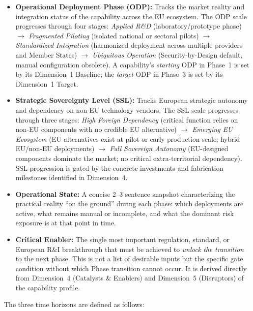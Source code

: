 \documentclass{ieeeaccess}
\begin{document}
\begin{itemize}
    \item \textbf{Operational Deployment Phase (ODP):} Tracks the market
    reality and integration status of the capability across the EU ecosystem.
    The ODP scale progresses through four stages:
    \emph{Applied R\&D} (laboratory/prototype phase) $\rightarrow$
    \emph{Fragmented Piloting} (isolated national or sectoral pilots) $\rightarrow$
    \emph{Standardized Integration} (harmonized deployment across multiple
    providers and Member States) $\rightarrow$
    \emph{Ubiquitous Operation} (Security-by-Design default, manual
    configuration obsolete). A capability's \emph{starting} ODP in Phase~1
    is set by its Dimension~1 Baseline; the \emph{target} ODP in Phase~3
    is set by its Dimension~1 Target.

    \item \textbf{Strategic Sovereignty Level (SSL):} Tracks European
    strategic autonomy and dependency on non-EU technology vendors. The SSL
    scale progresses through three stages:
    \emph{High Foreign Dependency} (critical function relies on non-EU
    components with no credible EU alternative) $\rightarrow$
    \emph{Emerging EU Ecosystem} (EU alternatives exist at pilot or early
    production scale; hybrid EU/non-EU deployments) $\rightarrow$
    \emph{Full Sovereign Autonomy} (EU-designed components dominate the
    market; no critical extra-territorial dependency). SSL progression is
    gated by the concrete investments and fabrication milestones identified
    in Dimension~4.

    \item \textbf{Operational State:} A concise 2--3 sentence snapshot
    characterizing the practical reality ``on the ground'' during each phase:
    which deployments are active, what remains manual or incomplete, and
    what the dominant risk exposure is at that point in time.

    \item \textbf{Critical Enabler:} The single most important regulation,
    standard, or European R\&I breakthrough that must be achieved to
    \emph{unlock the transition} to the next phase. This is not a list of
    desirable inputs but the specific gate condition without which Phase
    transition cannot occur. It is derived directly from Dimension~4
    (Catalysts \& Enablers) and Dimension~5 (Disruptors) of the capability
    profile.
\end{itemize}

The three time horizons are defined as follows:
\end{document}
